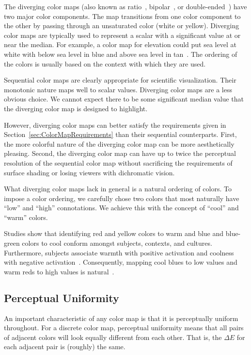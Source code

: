 \documentclass{vgtc}                          %
\newcommand{\lcite}[1]{~\cite{#1}}
\newcommand{\DeltaE}{\ensuremath{\Delta{}E}\xspace}
\begin{document}
The diverging color maps (also known as ratio\lcite{Ware04},
bipolar\lcite{Spence01}, or double-ended\lcite{Rheingans99}) have two major
color components.  The map transitions from one color component to the
other by passing through an unsaturated color (white or yellow).  Diverging
color maps are typically used to represent a scalar with a significant
value at or near the median.  For example, a color map for elevation could
put sea level at white with below sea level in blue and above sea level in
tan\lcite{Tufte97}.  The ordering of the colors is usually based on the
context with which they are used.

Sequential color maps are clearly appropriate for scientific visualization.
Their monotonic nature maps well to scalar values.  Diverging color maps
are a less obvious choice.  We cannot expect there to be some significant
median value that the diverging color map is designed to highlight.

However, diverging color maps can better satisfy the requirements given in
Section~\ref{sec:ColorMapRequirements} than their sequential counterparts.
First, the more colorful nature of the diverging color map can be more
aesthetically pleasing.  Second, the diverging color map can have up to
twice the perceptual resolution of the sequential color map without
sacrificing the requirements of surface shading or losing viewers
with dichromatic vision.

What diverging color maps lack in general is a natural ordering of colors.
To impose a color ordering, we carefully chose two colors that most
naturally have ``low'' and ``high'' connotations.  We achieve this with the
concept of ``cool'' and ``warm'' colors.

Studies show that identifying red and yellow colors to warm and blue and
blue-green colors to cool conform amongst subjects, contexts, and
cultures.  Furthermore, subjects associate warmth with positive activation
and coolness with negative activation\lcite{Hardin97}.  Consequently,
mapping cool blues to low values and warm reds to high values is
natural\lcite{Fortner97}.


\subsection{Perceptual Uniformity}
\label{sec:PerceptualUniformity}

An important characteristic of any color map is that it is perceptually
uniform throughout.  For a discrete color map, perceptual uniformity means
that all pairs of adjacent colors will look equally different from each
other.  That is, the \DeltaE for each adjacent pair is (roughly) the same.
\end{document}
